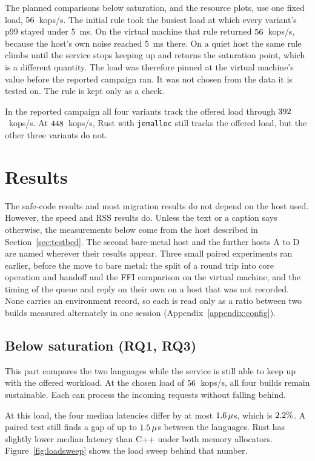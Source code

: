 \documentclass[english,oneside,a4paper,censored,csm,software-track-2020]{HYthesisML}
\begin{document}
The planned comparisons below saturation, and the resource plots, use one fixed
load, $56$~kops/s. The initial rule took the busiest load at which every
variant's p99 stayed under $5$~ms. On the virtual machine that rule returned
$56$~kops/s, because the host's own noise reached $5$~ms there.
On a quiet host the same rule climbs until the service stops keeping up and
returns the saturation point, which is a different quantity. The load was
therefore pinned at the virtual machine's value before the reported campaign
ran. It was not chosen from the data it is tested on. The rule is kept only as
a check.

In the reported campaign all four variants track the offered load through
$392$~kops/s. At
$448$~kops/s, Rust with \texttt{jemalloc} still tracks the offered
load, but the other three variants do not.

\section{Results}
The safe-code results and most migration results do not depend on the host used. 
However, the speed and RSS results do.
Unless the text or a caption says otherwise, the measurements below come from the host
described in Section~\ref{sec:testbed}. The second bare-metal host and the further hosts
A to D are named wherever their results appear. Three small paired experiments ran earlier,
before the move to bare metal: the split of a round trip into core operation and handoff
and the FFI comparison on the virtual machine, and the timing of the queue and reply on
their own on a host that was not recorded. None carries an environment record, so each is
read only as a ratio between two builds measured alternately in one session
(Appendix~\ref{appendix:config}).
\subsection{Below saturation (RQ1, RQ3)}\label{sec:perfresults}
This part compares the two languages while the service is still able to
keep up with the offered workload. At the chosen load of $56$~kops/s,
all four builds remain sustainable. Each can process the incoming requests
without falling behind.

At this load, the four median latencies differ by at most
$1.6\,\mu$s, which is $2.2\%$. A paired test still finds a
gap of up to $1.5\,\mu$s between the languages. Rust has slightly
lower median latency than C++ under both memory allocators.
Figure~\ref{fig:loadsweep} shows the load sweep behind that number.
\end{document}
